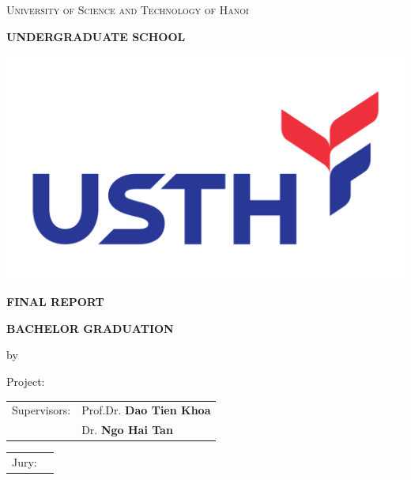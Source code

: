 \documentclass[a4paper,12pt]{report}
\theoremstyle{plain}\newtheorem{ques}{Question}
\theoremstyle{definition}\newtheorem*{ans}{Answer}
\begin{document}
        \begin{boxedminipage}[t]{15.8cm}
            \thispagestyle{empty}
            \centering
            {\scshape\Large University of Science and Technology of Hanoi \par}
            {\Large\bfseries \MakeUppercase{Undergraduate School} \par}
            \vspace{0.5cm}
            {\includegraphics[scale=0.08,valign=c]{logo/USTH_logo.png}\par}
            \vspace{0.5cm}
            {\Large\bfseries\MakeUppercase{Final Report}\par}
            {\LARGE\bfseries\MakeUppercase{Bachelor Graduation}\par}
            \vspace{0.4cm}
            {\large by\par}
            \vspace{0.3cm}
            {\Large\bfseries \theauthor\par}
            \vspace{1.5cm}
            {\Large Project:\par}
            {\huge \MakeUppercase{\thetitle}\par}
            \vspace{2cm}
            {\Large
            \begin{tabular}{p{3cm} p{7cm}}
                Supervisors: & Prof.Dr. \textbf{Dao Tien Khoa}\\
                             & Dr. \textbf{Ngo Hai Tan}
            \end{tabular}
            }
            \vspace{1cm}
            {\Large
            \begin{tabular}{p{3cm} p{7cm}}
                Jury: & 
            \end{tabular}
            }
            \vfill
            {\large\par}
        \end{boxedminipage}
        
\end{document}
